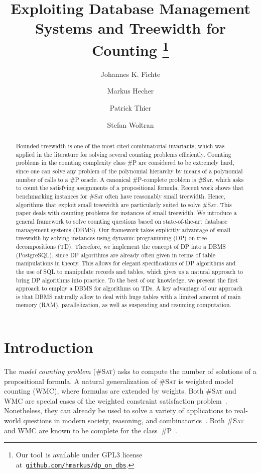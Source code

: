 \documentclass{llncs}
\title{Exploiting Database Management Systems and Treewidth for Counting%
  \thanks{%
    Our tool~\gpusatnu is available under GPL3 license
    at~\href{https://github.com/hmarkus/dp_on_dbs/releases/tag/TODOv1.001-pre}{\nolinkurl{github.com/hmarkus/dp_on_dbs}}.
  }%
%
}
\author{Johannes K. Fichte\inst{1}\orcidID{0000-0002-8681-7470}%
  \and Markus Hecher\inst{2,3}\orcidID{0000-0003-0131-6771} 
  \and Patrick Thier\inst{2}\orcidID{TODO0000-0003-0131-6771}
  \and Stefan Woltran\inst{2}\orcidID{TODO0000-0003-0131-6771}
}%
\institute{TU Dresden, %
  Germany \email{johannes.fichte@tu-dresden.de} %
  \and TU Wien, %
  Austria \email{\{hecher,woltran,thier\}@dbai.tuwien.ac.at} \and %
  University of
  Potsdam, %
  Germany \email{hecher@uni-potsdam.de}
%
%
%
%
}
\newcommand{\sharpP}{\#P\xspace}
\newcommand{\cSAT}{\textsc{\#Sat}\xspace}%
\newcommand{\WMC}{\textsc{WMC}\xspace}%
\begin{document}
\maketitle

\begin{abstract}
Bounded treewidth is one of the most cited combinatorial invariants, which was applied in the literature for solving several counting problems efficiently. Counting problems in the counting complexity class \#P are considered to be extremely hard, since one can solve any problem of the polynomial hierarchy
by means of a polynomial number of calls to a \#P oracle.
A canonical \#P-complete problem is \cSAT, which asks to count the satisfying assignments of a propositional formula. Recent work shows that benchmarking instances for \cSAT often have reasonably small treewidth. Hence, algorithms that exploit small treewidth are particularly suited to solve \cSAT.
This paper deals with counting problems for instances of small treewidth. We introduce a general framework to solve counting questions based on state-of-the-art database management systems (DBMS). Our framework takes explicitly advantage of small treewidth by solving instances using dynamic programming (DP) on tree decompositions (TD). Therefore, we implement the concept of DP into a DBMS (PostgreSQL), since DP algorithms are already often given in terms of table manipulations in theory. This allows for elegant specifications of DP algorithms and the use of SQL to manipulate records and tables, which gives us a natural approach to bring DP algorithms into practice. To the best of our knowledge, we present the first
approach to employ a DBMS for algorithms on TDs. A key advantage of our approach is that DBMS naturally allow to deal with huge tables with a limited amount of main memory (RAM), parallelization, as well as suspending and resuming computation.
\end{abstract}

\section{Introduction}
The \emph{model counting problem} (\cSAT) asks to compute the number
of solutions of a propositional formula.
%
A natural generalization of \cSAT is weighted model counting (\WMC),
where formulas are extended by weights. 
%
Both \cSAT and \WMC are special cases of the weighted constraint
satisfaction problem~\cite{Larrosa02a,ShapiroHaralick81a}. Nonetheless,
they can
%
%
%
%
%
%
%
%
%
%
%
already be used to solve a variety of applications to real-world
questions in modern society, %
reasoning, and
combinatorics~\cite{ChoiBroeckDarwiche15a,DomshlakHoffmann07a,MeelEtAl17a,SangBeameKautz05a,XueChoiDarwiche12a}.
%
Both \cSAT and \WMC are known to be complete for the
class~\sharpP~\cite{BacchusDalmaoPitassi03,Roth96}.
\end{document}

